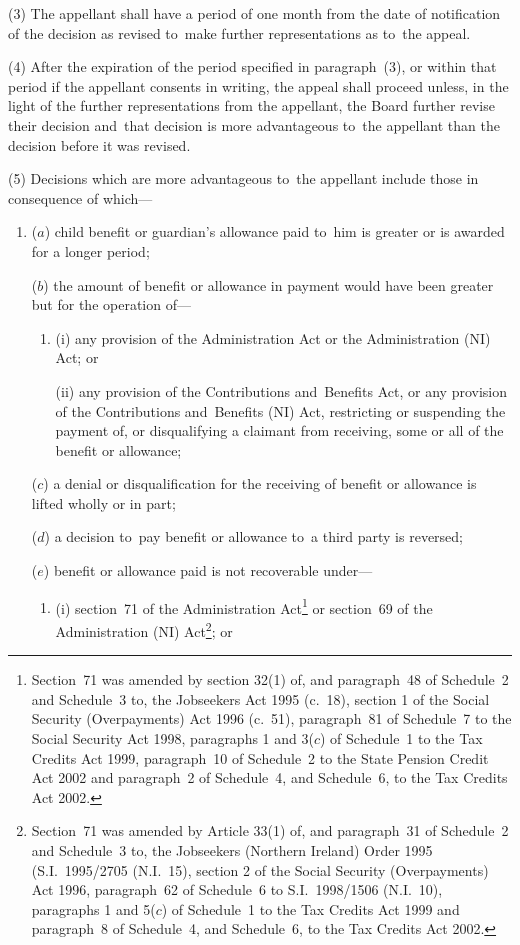 \documentclass[12pt,a4paper]{article}
\begin{document}
(3) The appellant shall have a period of one month from the date of notification of the decision as revised to~make further representations as to~the appeal.

(4) After the expiration of the period specified in paragraph~(3), or within that period if the appellant consents in writing, the appeal shall proceed unless, in the light of the further representations from the appellant, the Board further revise their decision and~that decision is more advantageous to~the appellant than the decision before it was revised.

(5) Decisions which are more advantageous to~the appellant include those in consequence of which—
\begin{enumerate}\item[]
($a$) child benefit or guardian’s allowance paid to~him is greater or is awarded for a longer period;

($b$) the amount of benefit or allowance in payment would have been greater but for the operation of—
\begin{enumerate}\item[]
(i) any provision of the Administration Act or the Administration (NI) Act; or

(ii) any provision of the Contributions and~Benefits Act, or any provision of the Contributions and~Benefits (NI) Act, restricting or suspending the payment of, or disqualifying a claimant from receiving, some or all of the benefit or allowance;
\end{enumerate}

($c$) a denial or disqualification for the receiving of benefit or allowance is lifted wholly or in part;

($d$) a decision to~pay benefit or allowance to~a third party is reversed;

($e$) benefit or allowance paid is not recoverable under—
\begin{enumerate}\item[]
(i) section~71 of the Administration Act\footnote{Section~71 was amended by section 32(1) of, and paragraph~48 of Schedule~2 and Schedule~3 to, the Jobseekers Act 1995 (c.~18), section 1 of the Social Security (Overpayments) Act 1996 (c.~51), paragraph~81 of Schedule~7 to the Social Security Act 1998, paragraphs 1 and 3($c$) of Schedule~1 to the Tax Credits Act 1999, paragraph~10 of Schedule~2 to the State Pension Credit Act 2002 and paragraph~2 of Schedule~4, and Schedule~6, to the Tax Credits Act 2002.} or section~69 of the Administration (NI) Act\footnote{Section~71 was amended by Article 33(1) of, and paragraph~31 of Schedule~2 and Schedule~3 to, the Jobseekers (Northern Ireland) Order 1995 (S.I.~1995/2705 (N.I.~15), section 2 of the Social Security (Overpayments) Act 1996, paragraph~62 of Schedule~6 to S.I.~1998/1506 (N.I.~10), paragraphs 1 and 5($c$) of Schedule~1 to the Tax Credits Act 1999 and paragraph~8 of Schedule~4, and Schedule~6, to the Tax Credits Act 2002.}; or


\end{enumerate}
\end{enumerate}
\end{document}
